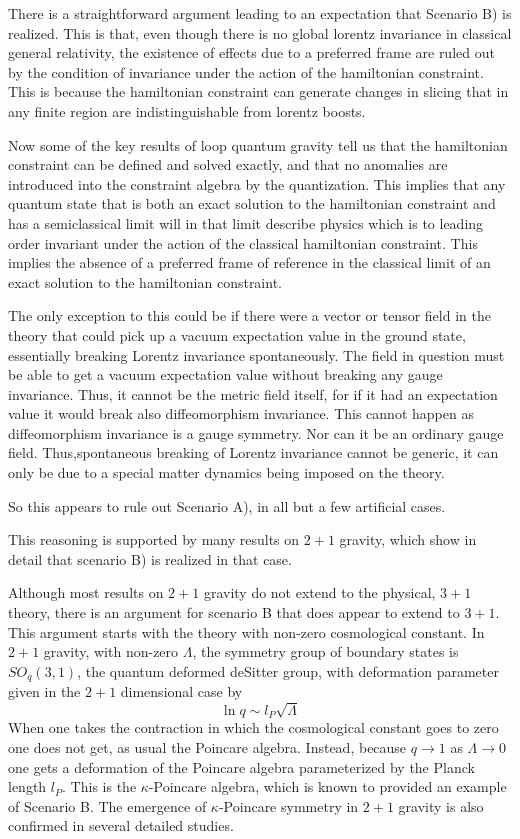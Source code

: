 \documentclass[12pt]{article}
\newcommand{\f}{\begin{equation}}
\newcommand{\ff}{\end{equation}}
\begin{document}
 There is a straightforward
 argument leading to an expectation that  Scenario B) is realized. This
  is that, even though there is no global lorentz invariance in
  classical general relativity, the existence of effects due
  to a preferred frame are ruled out by the condition of invariance
  under the action of the hamiltonian constraint. This is because
the hamiltonian constraint can generate
  changes in slicing that in any finite region are
  indistinguishable from lorentz boosts.  

  Now some of the key results of loop quantum gravity tell us that 
  the hamiltonian constraint can be defined and solved exactly, and
  that no anomalies are introduced into the constraint algebra by the
  quantization. This implies that any quantum
  state that is both an exact solution to the hamiltonian constraint
  and has a semiclassical limit will in that limit describe
  physics which is to leading order invariant under the action of
  the classical hamiltonian constraint. This implies the absence
  of a preferred frame of reference in the classical limit of an
  exact solution to the hamiltonian constraint.

The only exception to this could be if there were a vector or tensor field in the theory that could pick
up a vacuum expectation value in the ground state, essentially breaking Lorentz invariance
spontaneously.  The field in question must be able to get a vacuum expectation value without
breaking any gauge invariance. Thus, it 
cannot be the metric field itself, for if it had an expectation value it would
break also diffeomorphism invariance. This cannot happen as diffeomorphism invariance
is a gauge symmetry. Nor can it be an ordinary gauge field.  Thus,spontaneous breaking
of Lorentz invariance cannot be generic, it can only be due
to a special matter dynamics being imposed on the theory.  
  
  So this appears to rule out Scenario A), in all but a few artificial cases. 
  
This reasoning is supported by many results on $2+1$ gravity, 
which show in detail that scenario B) is realized in that case\cite{dsr2+1}. 

Although most results on $2+1$ gravity do not extend to the physical,
$3+1$ theory, there is an argument for scenario B that does appear to 
extend to $3+1$\cite{GAL}. This argument starts with the theory with non-zero 
cosmological constant. In $2+1$ gravity, with non-zero $\Lambda$, 
the symmetry group of boundary states 
is $SO_{q}(3,1)$, the quantum deformed deSitter group, with deformation
parameter given in the $2+1$ dimensional case by
\f
\ln  q \sim l_{P} \sqrt{\Lambda}
\label{2+1level}
\ff
When one takes the contraction in which the cosmological constant 
goes to zero one does not get, as usual the Poincare algebra. Instead,
because $q \rightarrow 1$ as $\Lambda \rightarrow 0$ one gets a 
deformation of the Poincare algebra parameterized by the Planck 
length $l_{P}$.  This is the $\kappa$-Poincare algebra, which is 
known to provided an example of Scenario B. The emergence of 
$\kappa$-Poincare symmetry in $2+1$ gravity is also confirmed in 
several detailed studies\cite{dsr2+1}.  
\end{document}
